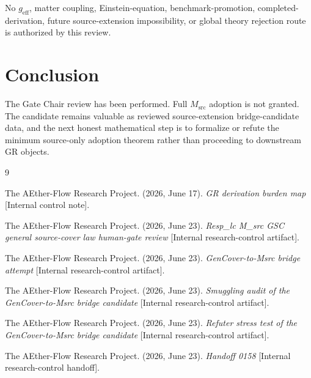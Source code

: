 \documentclass[11pt]{article}
\newcommand{\Msrc}{M_{\mathrm{src}}}
\newcommand{\geff}{g_{\mathrm{eff}}}
\begin{document}
No \(\geff\), matter coupling, Einstein-equation, benchmark-promotion,
completed-derivation, future source-extension impossibility, or global theory
rejection route is authorized by this review.

\section{Conclusion}

The Gate Chair review has been performed. Full \(\Msrc\) adoption is not
granted. The candidate remains valuable as reviewed source-extension
bridge-candidate data, and the next honest mathematical step is to formalize
or refute the minimum source-only adoption theorem rather than proceeding to
downstream GR objects.

\begin{thebibliography}{9}

The AEther-Flow Research Project. (2026, June 17). \emph{GR derivation burden
map} [Internal control note].

The AEther-Flow Research Project. (2026, June 23). \emph{Resp\_lc M\_src GSC
general source-cover law human-gate review} [Internal research-control
artifact].

The AEther-Flow Research Project. (2026, June 23). \emph{GenCover-to-Msrc
bridge attempt} [Internal research-control artifact].

The AEther-Flow Research Project. (2026, June 23). \emph{Smuggling audit of
the GenCover-to-Msrc bridge candidate} [Internal research-control artifact].

The AEther-Flow Research Project. (2026, June 23). \emph{Refuter stress test
of the GenCover-to-Msrc bridge candidate} [Internal research-control artifact].

The AEther-Flow Research Project. (2026, June 23). \emph{Handoff 0158}
[Internal research-control handoff].

\end{thebibliography}
\end{document}
